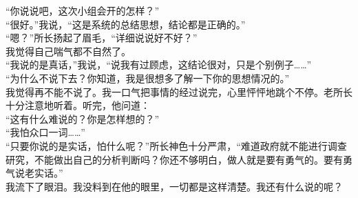 “你说说吧，这次小组会开的怎样？”\\

“很好。”我说，“这是系统的总结思想，结论都是正确的。”\\

“嗯？”所长扬起了眉毛，“详细说说好不好？”\\

我觉得自己喘气都不自然了。\\

“我说的是真话，”我说，“说我有过顾虑，这结论很对，只是个别例子……”\\

“为什么不说下去？你知道，我是很想多了解一下你的思想情况的。”\\

我觉得再不能不说了。我一口气把事情的经过说完，心里怦怦地跳个不停。老所长十分注意地听着。听完，他问道：\\

“这有什么难说的？你是怎样想的？”\\

“我怕众口一词……”\\

“只要你说的是实话，怕什么呢？”所长神色十分严肃，“难道政府就不能进行调查研究，不能做出自己的分析判断吗？你还不够明白，做人就是要有勇气的。要有勇气说老实话。”\\

我流下了眼泪。我没料到在他的眼里，一切都是这样清楚。我还有什么说的呢？\\